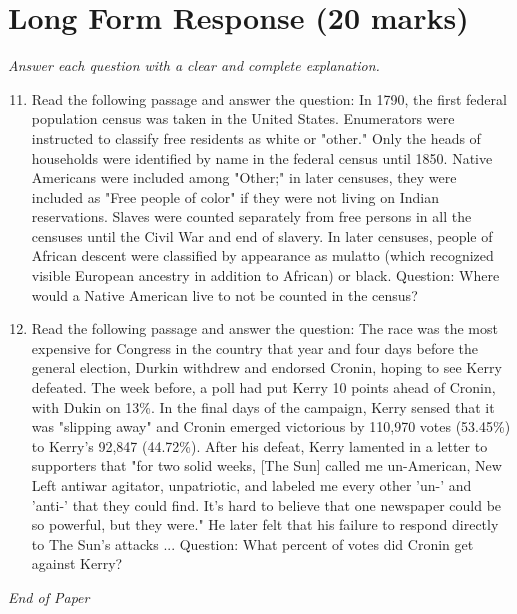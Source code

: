 \documentclass[12pt]{article}
\begin{document}
\section*{Long Form Response (20 marks)}
\textit{Answer each question with a clear and complete explanation.}
\begin{enumerate}[label=\arabic*.]
\setcounter{enumi}{10}
\item Read the following passage and answer the question: In 1790, the first federal population census was taken in the United States. Enumerators were instructed to classify free residents as white or "other." Only the heads of households were identified by name in the federal census until 1850. Native Americans were included among "Other;" in later censuses, they were included as "Free people of color" if they were not living on Indian reservations. Slaves were counted separately from free persons in all the censuses until the Civil War and end of slavery. In later censuses, people of African descent were classified by appearance as mulatto (which recognized visible European ancestry in addition to African) or black. Question: Where would a Native American live to not be counted in the census?
\item Read the following passage and answer the question: The race was the most expensive for Congress in the country that year and four days before the general election, Durkin withdrew and endorsed Cronin, hoping to see Kerry defeated. The week before, a poll had put Kerry 10 points ahead of Cronin, with Dukin on 13\%. In the final days of the campaign, Kerry sensed that it was "slipping away" and Cronin emerged victorious by 110,970 votes (53.45\%) to Kerry's 92,847 (44.72\%). After his defeat, Kerry lamented in a letter to supporters that "for two solid weeks, [The Sun] called me un-American, New Left antiwar agitator, unpatriotic, and labeled me every other 'un-' and 'anti-' that they could find. It's hard to believe that one newspaper could be so powerful, but they were." He later felt that his failure to respond directly to The Sun's attacks ... Question: What percent of votes did Cronin get against Kerry?
\end{enumerate}

\vfill
\noindent\textit{End of Paper}
\end{document}
